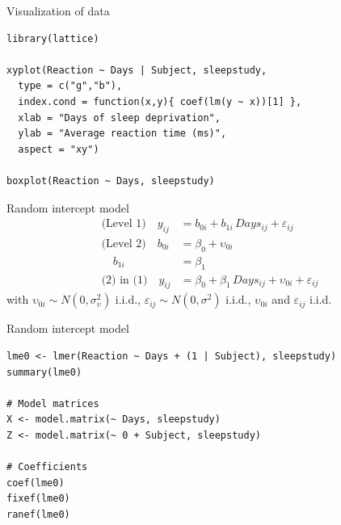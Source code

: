 \documentclass[aspectratio=169]{beamer}
\begin{document}
{

\begin{frame}[fragile]{Visualization of data}
\begin{lstlisting}
library(lattice)

xyplot(Reaction ~ Days | Subject, sleepstudy,
  type = c("g","b"),
  index.cond = function(x,y){ coef(lm(y ~ x))[1] },
  xlab = "Days of sleep deprivation",
  ylab = "Average reaction time (ms)",
  aspect = "xy")

boxplot(Reaction ~ Days, sleepstudy)
\end{lstlisting}
\end{frame}

}

\begin{frame}{Random intercept model}
\begin{align*}
\text{(Level 1)}  \quad y_{ij} &= b_{0i} + b_{1i}\,Days_{ij} + \varepsilon_{ij}\\
\text{(Level 2)}  \quad b_{0i} &= \beta_0 + \upsilon_{0i}\\
                  \quad b_{1i} &= \beta_1\\
\text{(2) in (1)} \quad y_{ij} &= \beta_0 + \beta_1\,Days_{ij} +
                                  \upsilon_{0i} + \varepsilon_{ij}
\end{align*}
\vfill
with $\upsilon_{0i} \sim N(0, \sigma^2_{\upsilon})$ i.i.d.,
$\varepsilon_{ij} \sim N(0, \sigma^2)$ i.i.d., $\upsilon_{0i}$ and
$\varepsilon_{ij}$ i.i.d.\\[2ex]
\vfill
\end{frame}

{

\begin{frame}[fragile]{Random intercept model}
\begin{lstlisting}
lme0 <- lmer(Reaction ~ Days + (1 | Subject), sleepstudy)
summary(lme0)

# Model matrices
X <- model.matrix(~ Days, sleepstudy)
Z <- model.matrix(~ 0 + Subject, sleepstudy)

# Coefficients
coef(lme0)
fixef(lme0)
ranef(lme0)
\end{lstlisting}
\end{frame}

}
\end{document}

